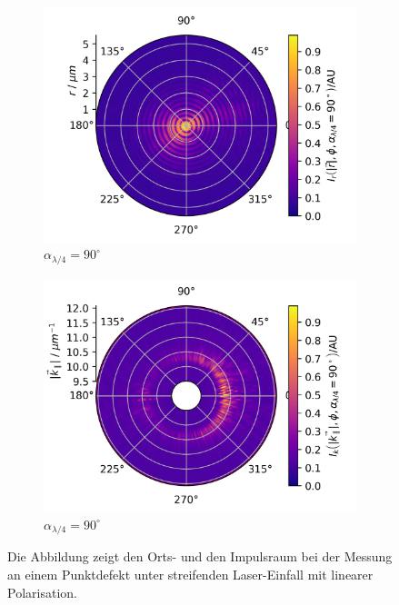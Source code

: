 \documentclass[a4paper, titlepage,  ngerman]{book}
\begin{document}
\begin{figure}
\begin{subfigure}{0.49\textwidth}
		\includegraphics[width=\textwidth]{figures/new/B_2_fp_90.png}
		\caption{$\alpha_{\lambda/4} = 90^\circ$}
	\end{subfigure}
	\begin{subfigure}{0.5\textwidth}
		\centering
		\includegraphics[width=\textwidth]{figures/new/B_2_bfp_90.png}
		\caption{$\alpha_{\lambda/4} = 90^\circ$}
	\end{subfigure}

	\caption[Orts- und Impulsraum Rohdaten bei linearer Polarisation]{Die Abbildung zeigt den Orts- und den Impulsraum bei der Messung an einem Punktdefekt unter streifenden Laser-Einfall mit linearer Polarisation.}			
\end{figure}
\end{document}
